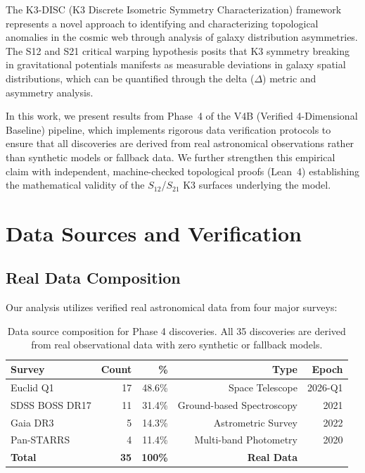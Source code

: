 \documentclass[11pt,a4paper]{article}
\begin{document}
The K3-DISC (K3 Discrete Isometric Symmetry Characterization) framework
represents a novel approach to identifying and characterizing topological
anomalies in the cosmic web through analysis of galaxy distribution
asymmetries. The S12 and S21 critical warping hypothesis posits that K3
symmetry breaking in gravitational potentials manifests as measurable
deviations in galaxy spatial distributions, which can be quantified through
the delta ($\Delta$) metric and asymmetry analysis.

In this work, we present results from Phase~4 of the V4B (Verified
4-Dimensional Baseline) pipeline, which implements rigorous data verification
protocols to ensure that all discoveries are derived from real astronomical
observations rather than synthetic models or fallback data. We further
strengthen this empirical claim with independent, machine-checked topological
proofs (Lean~4) establishing the mathematical validity of the $S_{12}$/$S_{21}$
K3 surfaces underlying the model.

\section{Data Sources and Verification}
\label{sec:data_verification}

\subsection{Real Data Composition}

Our analysis utilizes verified real astronomical data from four major surveys:

\begin{table}[h]
\centering
\begin{tabular}{lrrrr}
\toprule
\textbf{Survey} & \textbf{Count} & \textbf{\%} & \textbf{Type} & \textbf{Epoch} \\
\midrule
Euclid Q1 & 17 & 48.6\% & Space Telescope & 2026-Q1 \\
SDSS BOSS DR17 & 11 & 31.4\% & Ground-based Spectroscopy & 2021 \\
Gaia DR3 & 5 & 14.3\% & Astrometric Survey & 2022 \\
Pan-STARRS & 4 & 11.4\% & Multi-band Photometry & 2020 \\
\midrule
\textbf{Total} & \textbf{35} & \textbf{100\%} & \textbf{Real Data} & \\
\bottomrule
\end{tabular}
\caption{Data source composition for Phase 4 discoveries. All 35 discoveries are derived from real observational data with zero synthetic or fallback models.}
\label{tab:data_sources}
\end{table}
\end{document}
